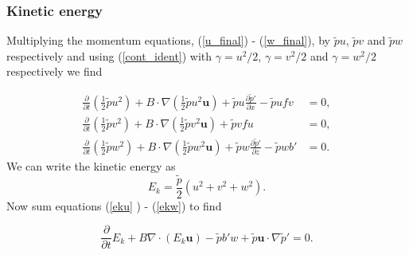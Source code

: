\documentclass[times]{qjrms4}
\begin{document}
\subsubsection{Kinetic energy}

Multiplying the momentum equations, (\ref{u_final}) - (\ref{w_final}), by 
$\tilde{p} u$, $\tilde{p} v$ and $\tilde{p} w$ respectively and 
using (\ref{cont_ident}) with $\gamma = u^2 / 2$,  $\gamma = v^2 / 2$  and
 $\gamma =  w^2 /2 $ respectively we find

\begin{subequations}
\begin{align}
\frac {\partial}{\partial t} \left( \frac12 \tilde{p} u^2 \right) + 
B \cdot \nabla \left( \frac12	\tilde{p} u^2 \mathbf u \right) 
+ 	\tilde{p} u \frac{\partial 	\tilde{p}'}{\partial x} - \tilde{p} u f v &= 0, \label{eku}\\
\frac {\partial}{\partial t} \left( \frac12 \tilde{p} v^2 \right) + 
B \cdot \nabla \left( \frac12 \tilde{p} v^2 \mathbf u \right) + \tilde{p} v f u &= 0, \label{ekv}\\
\frac {\partial}{\partial t} \left( \frac12 \tilde{p} w^2 \right) + 
B \cdot \nabla \left( \frac12 \tilde{p} w^2 \mathbf u \right) + 
\tilde{p} w \frac{\partial \tilde{p}'}{\partial z} - \tilde{p} w b' &= 0. \label{ekw} 
\end{align}
\end{subequations}
%
We can write the kinetic energy as 
\begin{equation} \label{kinetic_energy}
E_k = \frac{\tilde{p}}{2} \left(u^2 + v^2 + w^2 \right).
\end{equation}
Now sum equations (\ref{eku} ) - (\ref{ekw}) to find

\begin{equation}
\frac {\partial}{\partial t} E_k + B \nabla \cdot (E_k \mathbf u) - \tilde{p} b' w + 
 \tilde{p} \mathbf u \cdot \nabla \tilde{p}' = 0. \label{kineticE}
\end{equation}
\end{document}
